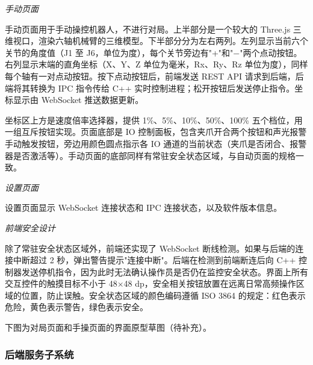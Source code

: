 \documentclass[a4paper, 12pt, oneside]{ctexart}
\begin{document}
\noindent\textit{手动页面}

手动页面用于手动操控机器人，不进行对局。上半部分是一个较大的 Three.js 三维视口，渲染六轴机械臂的三维模型。下半部分分为左右两列。左列显示当前六个关节的角度值（J1 至 J6，单位为度），每个关节旁边有"+"和"$-$"两个点动按钮。右列显示末端的直角坐标（X、Y、Z 单位为毫米，Rx、Ry、Rz 单位为度），同样每个轴有一对点动按钮。按下点动按钮后，前端发送 REST API 请求到后端，后端将其转换为 IPC 指令传给 C++ 实时控制进程；松开按钮后发送停止指令。坐标显示由 WebSocket 推送数据更新。

坐标区上方是速度倍率选择器，提供 1\%、5\%、10\%、50\%、100\% 五个档位，用一组互斥按钮实现。页面底部是 IO 控制面板，包含夹爪开合两个按钮和声光报警手动触发按钮，旁边用颜色圆点指示各 IO 通道的当前状态（夹爪是否闭合、报警器是否激活等）。手动页面的底部同样有常驻安全状态区域，与自动页面的规格一致。

\noindent\textit{设置页面}

设置页面显示 WebSocket 连接状态和 IPC 连接状态，以及软件版本信息。

\noindent\textit{前端安全设计}

除了常驻安全状态区域外，前端还实现了 WebSocket 断线检测。如果与后端的连接中断超过 2 秒，弹出警告提示"连接中断"。后端在检测到前端断连后向 C++ 控制器发送停机指令，因为此时无法确认操作员是否仍在监控安全状态。界面上所有交互控件的触摸目标不小于 48$\times$48 dp，安全相关按钮放置在远离日常高频操作区域的位置，防止误触。安全状态区域的颜色编码遵循 ISO 3864 的规定：红色表示危险，黄色表示警告，绿色表示安全。

下图为对局页面和手操页面的界面原型草图（待补充）。

\begin{center}
\hfill
{}
\end{center}

\subsubsection*{后端服务子系统}
\end{document}
